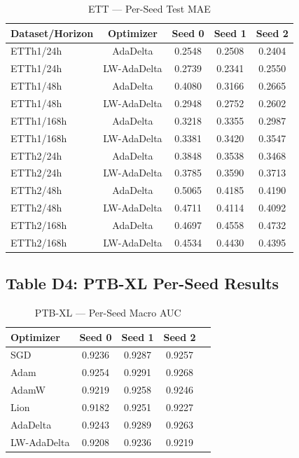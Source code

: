 \documentclass[11pt,a4paper]{article}
\begin{document}
\begin{table}[H]
\centering
\caption{ETT --- Per-Seed Test MAE}
\label{tab:perseed-ett}
\begin{tabular}{lcccc}
\toprule
\textbf{Dataset/Horizon} & \textbf{Optimizer} & \textbf{Seed 0} & \textbf{Seed 1} & \textbf{Seed 2} \\
\midrule
ETTh1/24h & AdaDelta & 0.2548 & 0.2508 & 0.2404 \\
ETTh1/24h & LW-AdaDelta & 0.2739 & 0.2341 & 0.2550 \\
ETTh1/48h & AdaDelta & 0.4080 & 0.3166 & 0.2665 \\
ETTh1/48h & LW-AdaDelta & 0.2948 & 0.2752 & 0.2602 \\
ETTh1/168h & AdaDelta & 0.3218 & 0.3355 & 0.2987 \\
ETTh1/168h & LW-AdaDelta & 0.3381 & 0.3420 & 0.3547 \\
ETTh2/24h & AdaDelta & 0.3848 & 0.3538 & 0.3468 \\
ETTh2/24h & LW-AdaDelta & 0.3785 & 0.3590 & 0.3713 \\
ETTh2/48h & AdaDelta & 0.5065 & 0.4185 & 0.4190 \\
ETTh2/48h & LW-AdaDelta & 0.4711 & 0.4114 & 0.4092 \\
ETTh2/168h & AdaDelta & 0.4697 & 0.4558 & 0.4732 \\
ETTh2/168h & LW-AdaDelta & 0.4534 & 0.4430 & 0.4395 \\
\bottomrule
\end{tabular}
\end{table}

\subsection*{Table D4: PTB-XL Per-Seed Results}

\begin{table}[H]
\centering
\caption{PTB-XL --- Per-Seed Macro AUC}
\label{tab:perseed-ptbxl}
\begin{tabular}{lcccc}
\toprule
\textbf{Optimizer} & \textbf{Seed 0} & \textbf{Seed 1} & \textbf{Seed 2} \\
\midrule
SGD & 0.9236 & 0.9287 & 0.9257 \\
Adam & 0.9254 & 0.9291 & 0.9268 \\
AdamW & 0.9219 & 0.9258 & 0.9246 \\
Lion & 0.9182 & 0.9251 & 0.9227 \\
AdaDelta & 0.9243 & 0.9289 & 0.9263 \\
LW-AdaDelta & 0.9208 & 0.9236 & 0.9219 \\
\bottomrule
\end{tabular}
\end{table}
\end{document}
